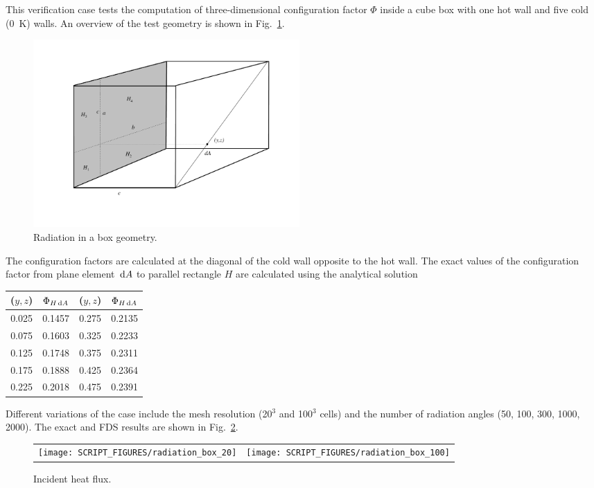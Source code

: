 \documentclass[11pt]{book}
\begin{document}
This verification case tests the computation of three-dimensional configuration factor $\Phi$ inside a cube box with one hot wall and five cold (0~K) walls. An overview of the test geometry is shown in Fig.~\ref{fig_box_radiation}.
\begin{figure}[ht]
\centering
\includegraphics[width=4.0in]{FIGURES/box}
\caption{\label{fig_box_radiation} Radiation in a box geometry.}
\end{figure}
The configuration factors are calculated at the diagonal of the cold wall opposite to the hot wall. The exact values of the configuration factor from plane element $\,\mathrm{d} A$ to parallel rectangle $H$ are calculated using the analytical solution~\cite{Siegel:1}
\begin{center}
\begin{tabular}{|c|c|c|c|}
\hline ($y,z$) & $\Phi_{H \,\mathrm{d} A}$ & ($y,z$) & $\Phi_{H \,\mathrm{d} A}$ \\ \hline \hline
0.025   &0.1457 & 0.275 &0.2135 \\
0.075   &0.1603 & 0.325 &0.2233 \\
0.125   &0.1748 & 0.375 &0.2311 \\
0.175   &0.1888 & 0.425 &0.2364 \\
0.225   &0.2018 & 0.475 &0.2391 \\ \hline
\end{tabular}
\end{center}
Different variations of the case include the mesh resolution (20$^3$ and 100$^3$ cells) and the number of radiation angles (50, 100, 300, 1000, 2000). The exact and FDS results are shown in Fig.~\ref{fig_incident_heat_flux}.

\begin{figure}[ht]
\centering
\begin{tabular*}{\textwidth}{lr}
\texttt{[image: SCRIPT\_FIGURES/radiation\_box\_20]} &
\texttt{[image: SCRIPT\_FIGURES/radiation\_box\_100]}
\end{tabular*}
\caption{Incident heat flux.}\label{fig_incident_heat_flux}
\end{figure}
\end{document}
